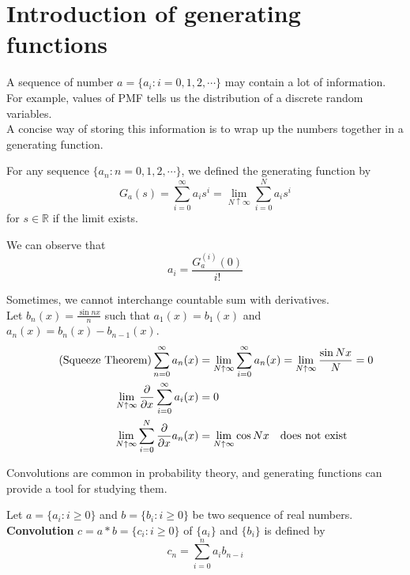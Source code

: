 \documentclass{huhtakm-template-book}
\begin{document}
\section{Introduction of generating functions}
A sequence of number $a=\{a_{i}:i=0,1,2,\cdots\}$ may contain a lot of information. For example, values of PMF tells us the distribution of a discrete random variables.\\
A concise way of storing this information is to wrap up the numbers together in a generating function. 
\begin{defn}
    For any sequence $\{a_{n}:n=0,1,2,\cdots\}$, we defined the generating function by
    \begin{equation*}
        G_{a}(s)=\sum_{i=0}^{\infty}a_{i}s^{i}=\lim_{N\uparrow\infty}\sum_{i=0}^{N}a_{i}s^{i}
    \end{equation*}
    for $s\in\mathbb{R}$ if the limit exists. 
\end{defn}
\begin{rem}
    We can observe that
\begin{equation*}
    a_{i}=\frac{G_{a}^{(i)}(0)}{i!}
\end{equation*}
\end{rem}
\begin{eg}
    Sometimes, we cannot interchange countable sum with derivatives.\\
    Let $b_{n}(x)=\frac{\sin{nx}}{n}$ such that $a_{1}(x)=b_{1}(x)$ and $a_{n}(x)=b_{n}(x)-b_{n-1}(x)$.
    \begin{align*}
        \tag{Squeeze Theorem}
        \sum_{n=0}^{\infty}a_{n}(x)&=\lim_{N\uparrow\infty}\sum_{i=0}^{\infty}a_{n}(x)=\lim_{N\uparrow\infty}\frac{\sin{Nx}}{N}=0\\
        \lim_{N\uparrow\infty}\pdv*{\sum_{i=0}^{\infty}a_{i}(x)}{x}&=0\\
        \lim_{N\uparrow\infty}\sum_{i=0}^{N}\pdv*{a_{n}(x)}{x}&=\lim_{N\uparrow\infty}\cos{Nx}\quad \text{does not exist}
    \end{align*}
\end{eg}
Convolutions are common in probability theory, and generating functions can provide a tool for studying them.
\begin{defn}
    Let $a=\{a_{i}:i\geq 0\}$ and $b=\{b_{i}:i\geq 0\}$ be two sequence of real numbers. \textbf{Convolution} $c=a*b=\{c_{i}:i\geq 0\}$ of $\{a_{i}\}$ and $\{b_{i}\}$ is defined by
    \begin{equation*}
        c_{n}=\sum_{i=0}^{n}a_{i}b_{n-i}
    \end{equation*}
\end{defn}
\end{document}
